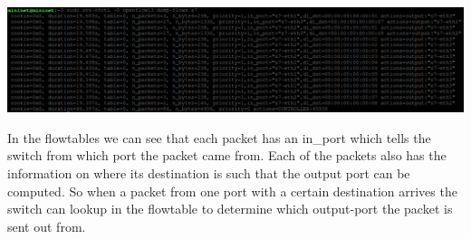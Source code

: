 \documentclass{article}
\begin{document}
\begin{adjustwidth}{2em}{2em}
\begin{enumerate}
			\includegraphics[scale=0.42]{tree_flowtables_3.png} \\
		\end{enumerate}
		In the flowtables we can see that each packet has an in\_port which tells the switch from which port the packet came from. Each of the packets also has the information on where its destination is such that the output port can be computed. So when a packet from one port with a certain destination arrives the switch can lookup in the flowtable to determine which output-port the packet is sent out from.
	\end{adjustwidth}	
\end{document}
